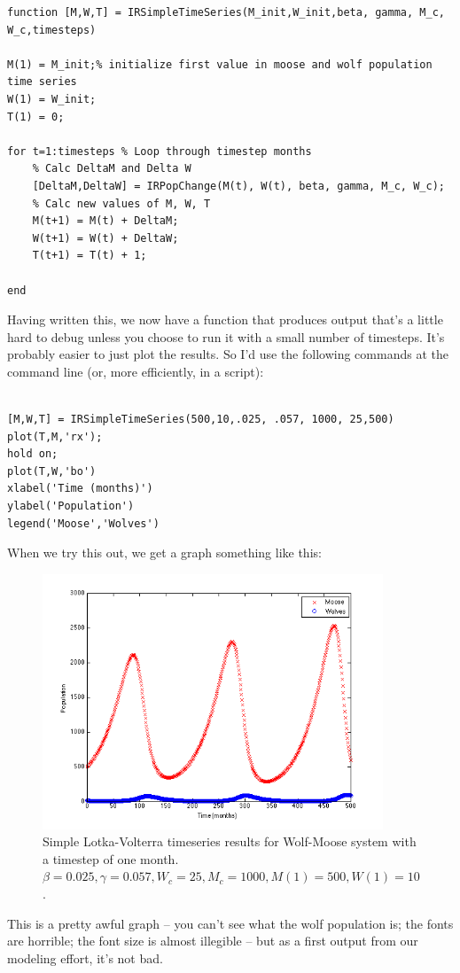 \documentclass{tufte-handout}
\begin{document}
\begin{verbatim}
function [M,W,T] = IRSimpleTimeSeries(M_init,W_init,beta, gamma, M_c, W_c,timesteps)

M(1) = M_init;% initialize first value in moose and wolf population time series
W(1) = W_init;
T(1) = 0;

for t=1:timesteps % Loop through timestep months
    % Calc DeltaM and Delta W
    [DeltaM,DeltaW] = IRPopChange(M(t), W(t), beta, gamma, M_c, W_c); 
    % Calc new values of M, W, T
    M(t+1) = M(t) + DeltaM; 
    W(t+1) = W(t) + DeltaW;
    T(t+1) = T(t) + 1;
        
end
\end{verbatim}

Having written this, we now have a function that produces output that's a little hard to debug unless you choose to run it with a small number of timesteps.  It's probably easier to just plot the results.  So I'd use the following commands at the command line (or, more efficiently, in a script):
\begin{verbatim}

[M,W,T] = IRSimpleTimeSeries(500,10,.025, .057, 1000, 25,500)
plot(T,M,'rx');
hold on;
plot(T,W,'bo')
xlabel('Time (months)')
ylabel('Population')
legend('Moose','Wolves')
\end{verbatim}

When we try this out, we get a graph something like this:
\begin{figure}[h!]
\includegraphics[width=4in]{figs/WolfMooseTImeSeries}
\caption{Simple Lotka-Volterra timeseries results for Wolf-Moose system with a timestep of one month.  $\beta = 0.025, \gamma = 0.057, W_c = 25, M_c=1000, M(1) = 500, W(1) = 10$.}
\end{figure}

This is a pretty awful graph -- you can't see what the wolf population is; the fonts are horrible; the font size is almost illegible -- but as a first output from our modeling effort, it's not bad.  
\end{document}

